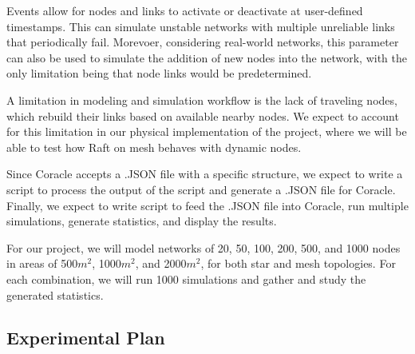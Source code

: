 Events allow for nodes and links to activate or deactivate at user-defined timestamps. This can simulate unstable networks with multiple unreliable links that periodically fail. Morevoer, considering real-world networks, this parameter can also be used to simulate the addition of new nodes into the network, with the only limitation being that node links would be predetermined. 

A limitation in modeling and simulation workflow is the lack of traveling nodes, which rebuild their links based on available nearby nodes. We expect to account for this limitation in our physical implementation of the project, where we will be able to test how Raft on mesh behaves with dynamic nodes.

Since Coracle accepts a .JSON file with a specific structure, we expect to write a  script to process the output of the  script and generate a .JSON file for Coracle. Finally, we expect to write  script to feed the .JSON file into Coracle, run multiple simulations, generate statistics, and display the results. 

For our project, we will model networks of 20, 50, 100, 200, 500, and 1000 nodes in areas of 500$m^2$, 1000$m^2$, and 2000$m^2$, for both star and mesh topologies. For each combination, we will run 1000 simulations and gather and study the generated statistics.

\subsection{Experimental Plan}

